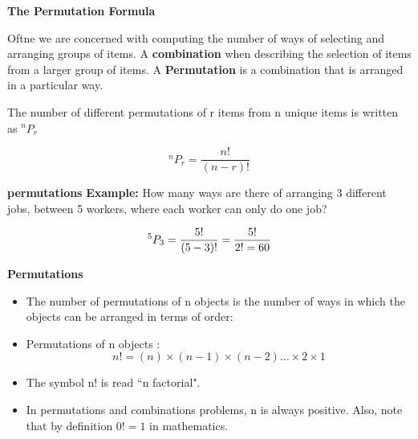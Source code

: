 
	
{
		
		\textbf{The Permutation Formula}
		
		Oftne we are concerned with computing the number of ways of selecting and arranging groups of items. A \textbf{combination} when describing the selection of items from a larger group of items. A \textbf{Permutation} is a combination that is arranged in a particular way.
		
	}
	{
		
		The number of different permutations of r items from n unique items is written as $^n P_r$
		
		
		\[ ^n P_r = \frac{n!}{(n-r)!}\]
	}
	
	{
		\textbf{permutations}
		\textbf{Example:}
		How many ways are there of arranging 3 different jobs, between 5 workers, where each worker can only do one job?
		
		
		\[ ^5 P_3 = \frac{5!}{(5-3)!}  = {5! \over 2! = 60}\]
		
	}
		
	
	\textbf{Permutations}
	
	\begin{itemize}
		\item The number of permutations of n objects is the number of ways in which the objects can be arranged in
		terms of order: \item
		Permutations of n objects : \[n! = (n) \times (n - 1) \times (n-2) \ldots  \times 2 \times 1 \]
		\item
		
		The symbol n! is read ``n factorial". 
		\item In permutations and combinations problems, n is always positive.
		Also, note that by definition $0! = 1$ in mathematics.
	\end{itemize}
	
